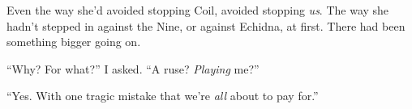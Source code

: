Even the way she'd avoided stopping Coil, avoided stopping \emph{us}.  The way she hadn't stepped in against the Nine, or against Echidna, at first.  There had been something bigger going on.



``Why?  For what?'' I asked.  ``A ruse?  \emph{Playing} me?''



``Yes.  With one tragic mistake that we're \emph{all} about to pay for.''





